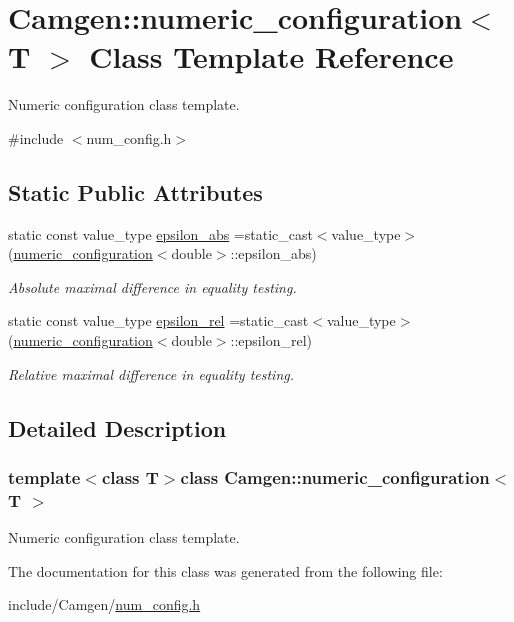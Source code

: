 \hypertarget{a00382}{\section{Camgen\-:\-:numeric\-\_\-configuration$<$ T $>$ Class Template Reference}
\label{a00382}
}


Numeric configuration class template.  




{\ttfamily \#include $<$num\-\_\-config.\-h$>$}

\subsection*{Static Public Attributes}
\begin{DoxyCompactItemize}
\item 
\hypertarget{a00382_a361b4d770ea73940abcedb6343e32e32}{static const value\-\_\-type \hyperlink{a00382_a361b4d770ea73940abcedb6343e32e32}{epsilon\-\_\-abs} =static\-\_\-cast$<$value\-\_\-type$>$(\hyperlink{a00382}{numeric\-\_\-configuration}$<$double$>$\-::epsilon\-\_\-abs)}\label{a00382_a361b4d770ea73940abcedb6343e32e32}

\begin{DoxyCompactList}\small\item\em Absolute maximal difference in equality testing. \end{DoxyCompactList}\item 
\hypertarget{a00382_a4fbb087868e215934a73ae0285ee40e5}{static const value\-\_\-type \hyperlink{a00382_a4fbb087868e215934a73ae0285ee40e5}{epsilon\-\_\-rel} =static\-\_\-cast$<$value\-\_\-type$>$(\hyperlink{a00382}{numeric\-\_\-configuration}$<$double$>$\-::epsilon\-\_\-rel)}\label{a00382_a4fbb087868e215934a73ae0285ee40e5}

\begin{DoxyCompactList}\small\item\em Relative maximal difference in equality testing. \end{DoxyCompactList}\end{DoxyCompactItemize}


\subsection{Detailed Description}
\subsubsection*{template$<$class T$>$class Camgen\-::numeric\-\_\-configuration$<$ T $>$}

Numeric configuration class template. 

The documentation for this class was generated from the following file\-:\begin{DoxyCompactItemize}
\item 
include/\-Camgen/\hyperlink{a00680}{num\-\_\-config.\-h}\end{DoxyCompactItemize}
